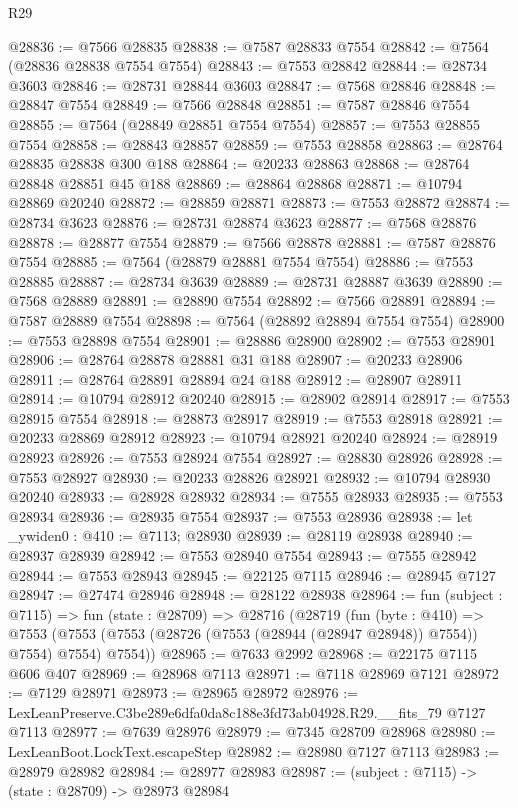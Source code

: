 \begin{lexlean}{R29}
\begin{coremodule}
@28836 := @7566 @28835
@28838 := @7587 @28833 @7554
@28842 := @7564 (@28836 @28838 @7554 @7554)
@28843 := @7553 @28842
@28844 := @28734 @3603
@28846 := @28731 @28844 @3603
@28847 := @7568 @28846
@28848 := @28847 @7554
@28849 := @7566 @28848
@28851 := @7587 @28846 @7554
@28855 := @7564 (@28849 @28851 @7554 @7554)
@28857 := @7553 @28855 @7554
@28858 := @28843 @28857
@28859 := @7553 @28858
@28863 := @28764 @28835 @28838 @300 @188
@28864 := @20233 @28863
@28868 := @28764 @28848 @28851 @45 @188
@28869 := @28864 @28868
@28871 := @10794 @28869 @20240
@28872 := @28859 @28871
@28873 := @7553 @28872
@28874 := @28734 @3623
@28876 := @28731 @28874 @3623
@28877 := @7568 @28876
@28878 := @28877 @7554
@28879 := @7566 @28878
@28881 := @7587 @28876 @7554
@28885 := @7564 (@28879 @28881 @7554 @7554)
@28886 := @7553 @28885
@28887 := @28734 @3639
@28889 := @28731 @28887 @3639
@28890 := @7568 @28889
@28891 := @28890 @7554
@28892 := @7566 @28891
@28894 := @7587 @28889 @7554
@28898 := @7564 (@28892 @28894 @7554 @7554)
@28900 := @7553 @28898 @7554
@28901 := @28886 @28900
@28902 := @7553 @28901
@28906 := @28764 @28878 @28881 @31 @188
@28907 := @20233 @28906
@28911 := @28764 @28891 @28894 @24 @188
@28912 := @28907 @28911
@28914 := @10794 @28912 @20240
@28915 := @28902 @28914
@28917 := @7553 @28915 @7554
@28918 := @28873 @28917
@28919 := @7553 @28918
@28921 := @20233 @28869 @28912
@28923 := @10794 @28921 @20240
@28924 := @28919 @28923
@28926 := @7553 @28924 @7554
@28927 := @28830 @28926
@28928 := @7553 @28927
@28930 := @20233 @28826 @28921
@28932 := @10794 @28930 @20240
@28933 := @28928 @28932
@28934 := @7555 @28933
@28935 := @7553 @28934
@28936 := @28935 @7554
@28937 := @7553 @28936
@28938 := let _ywiden0 : @410 := @7113; @28930
@28939 := @28119 @28938
@28940 := @28937 @28939
@28942 := @7553 @28940 @7554
@28943 := @7555 @28942
@28944 := @7553 @28943
@28945 := @22125 @7115
@28946 := @28945 @7127
@28947 := @27474 @28946
@28948 := @28122 @28938
@28964 := fun (subject : @7115) =>
  fun (state : @28709) =>
  @28716
    (@28719
      (fun (byte : @410) =>
      @7553 (@7553 (@7553 (@28726 (@7553 (@28944 (@28947 @28948)) @7554)) @7554) @7554) @7554))
@28965 := @7633 @2992
@28968 := @22175 @7115 @606 @407
@28969 := @28968 @7113
@28971 := @7118 @28969 @7121
@28972 := @7129 @28971
@28973 := @28965 @28972
@28976 := LexLeanPreserve.C3be289e6dfa0da8c188e3fd73ab04928.R29.__fits_79 @7127 @7113
@28977 := @7639 @28976
@28979 := @7345 @28709 @28968
@28980 := LexLeanBoot.LockText.escapeStep
@28982 := @28980 @7127 @7113
@28983 := @28979 @28982
@28984 := @28977 @28983
@28987 := (subject : @7115) -> (state : @28709) -> @28973 @28984

\end{coremodule}
\end{lexlean}
